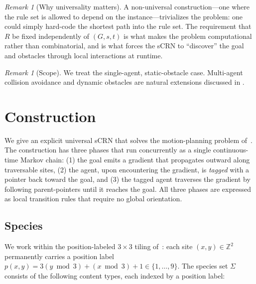 \documentclass[11pt]{article}
\theoremstyle{plain}
\theoremstyle{definition}
\theoremstyle{remark}
\newtheorem{remark}[theorem]{Remark}
\newcommand{\Z}{\mathbb{Z}}
\begin{document}
\begin{remark}[Why universality matters]
A non-universal construction---one where the rule set is allowed to depend on the instance---trivializes the problem: one could simply hard-code the shortest path into the rule set. The requirement that $R$ be fixed independently of $(G, s, t)$ is what makes the problem computational rather than combinatorial, and is what forces the sCRN to ``discover'' the goal and obstacles through local interactions at runtime.
\end{remark}

\begin{remark}[Scope]
We treat the single-agent, static-obstacle case. Multi-agent collision avoidance and dynamic obstacles are natural extensions discussed in .
\end{remark}


\section{Construction}
\label{sec:construction}

We give an explicit universal sCRN that solves the motion-planning problem of~. The construction has three phases that run concurrently as a single continuous-time Markov chain: (1) the goal emits a gradient that propagates outward along traversable sites, (2) the agent, upon encountering the gradient, is \emph{tagged} with a pointer back toward the goal, and (3) the tagged agent traverses the gradient by following parent-pointers until it reaches the goal. All three phases are expressed as local transition rules that require no global orientation.

\subsection{Species}
\label{subsec:species}

We work within the position-labeled $3 \times 3$ tiling of~: each site $(x,y) \in \Z^2$ permanently carries a position label $p(x,y) = 3(y \bmod 3) + (x \bmod 3) + 1 \in \{1, \ldots, 9\}$. The species set $\Sigma$ consists of the following content types, each indexed by a position label:
\end{document}
